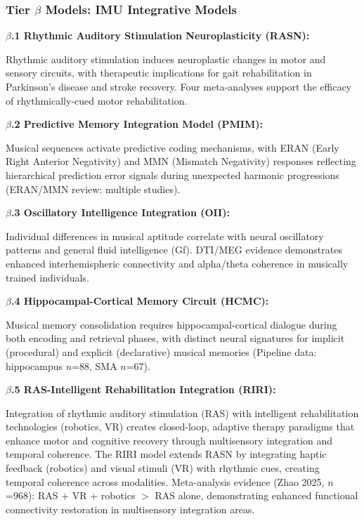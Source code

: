 \documentclass[9pt,onecolumn]{article}
\begin{document}
\subsubsection{Tier $\beta$ Models: IMU Integrative Models}

\textbf{$\beta$.1 Rhythmic Auditory Stimulation Neuroplasticity (RASN):}

Rhythmic auditory stimulation induces neuroplastic changes in motor and sensory circuits, with therapeutic implications for gait rehabilitation in Parkinson's disease and stroke recovery. Four meta-analyses support the efficacy of rhythmically-cued motor rehabilitation.

\textbf{$\beta$.2 Predictive Memory Integration Model (PMIM):}

Musical sequences activate predictive coding mechanisms, with ERAN (Early Right Anterior Negativity) and MMN (Mismatch Negativity) responses reflecting hierarchical prediction error signals during unexpected harmonic progressions (ERAN/MMN review: multiple studies).

\textbf{$\beta$.3 Oscillatory Intelligence Integration (OII):}

Individual differences in musical aptitude correlate with neural oscillatory patterns and general fluid intelligence (Gf). DTI/MEG evidence demonstrates enhanced interhemispheric connectivity and alpha/theta coherence in musically trained individuals.

\textbf{$\beta$.4 Hippocampal-Cortical Memory Circuit (HCMC):}

Musical memory consolidation requires hippocampal-cortical dialogue during both encoding and retrieval phases, with distinct neural signatures for implicit (procedural) and explicit (declarative) musical memories (Pipeline data: hippocampus $n$=88, SMA $n$=67).

\textbf{$\beta$.5 RAS-Intelligent Rehabilitation Integration (RIRI):}

Integration of rhythmic auditory stimulation (RAS) with intelligent rehabilitation technologies (robotics, VR) creates closed-loop, adaptive therapy paradigms that enhance motor and cognitive recovery through multisensory integration and temporal coherence. The RIRI model extends RASN by integrating haptic feedback (robotics) and visual stimuli (VR) with rhythmic cues, creating temporal coherence across modalities. Meta-analysis evidence (Zhao 2025, $n$=968): RAS + VR + robotics $>$ RAS alone, demonstrating enhanced functional connectivity restoration in multisensory integration areas.
\end{document}
